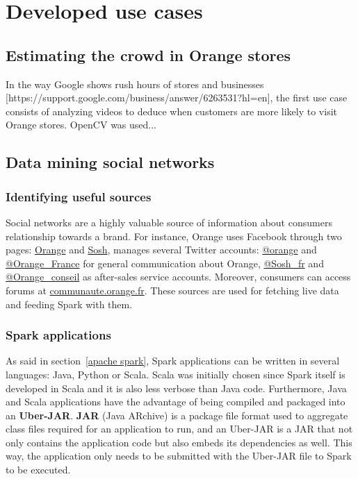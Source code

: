 \documentclass[11pt]{article}
\begin{document}
\section{Developed use cases}
\subsection{Estimating the crowd in Orange stores}

In the way \textsf{Google} shows rush hours of stores and businesses [https://support.google.com/business/answer/6263531?hl=en], the first use case consists of analyzing videos to deduce when customers are more likely to visit \textsf{Orange} stores. \textsf{OpenCV} was used...

\subsection{Data mining social networks}

\subsubsection{Identifying useful sources}

Social networks are a highly valuable source of information about consumers relationship towards a brand. For instance, \textsf{Orange} uses \textsf{Facebook} through two pages: \href{https://www.facebook.com/Orange.France/?ref=ts}{\textsf{Orange}} and \href{https://www.facebook.com/sosh/?fref=ts}{\textsf{Sosh}}, manages several \textsf{Twitter} accounts: \href{https://twitter.com/orange}{\textsf{@orange}} and \href{https://twitter.com/Orange_France}{\textsf{@Orange\_France}} for general communication about \textsf{Orange}, \href{https://twitter.com/Sosh_fr}{\textsf{@Sosh\_fr}} and \href{https://twitter.com/Orange_conseil}{\textsf{@Orange\_conseil}} as after-sales service accounts. Moreover, consumers can access forums at \href{https://communaute.orange.fr}{\url{communaute.orange.fr}}. These sources are used for fetching live data and feeding \textsf{Spark} with them.

\subsubsection{Spark applications}

As said in section~\ref{apache spark}, \textsf{Spark} applications can be written in several languages: \textsf{Java}, \textsf{Python} or \textsf{Scala}. \textsf{Scala} was initially chosen since \textsf{Spark} itself is developed in \textsf{Scala} and it is also less verbose than \textsf{Java} code. Furthermore, \textsf{Java} and \textsf{Scala} applications have the advantage of being compiled and packaged into an \textsf{\textbf{Uber-JAR}}. \textsf{\textbf{JAR}} (\textsf{Java} ARchive) is a package file format used to aggregate class files required for an application to run, and an \textsf{Uber-JAR} is a \textsf{JAR} that not only contains the application code but also embeds its dependencies as well. This way, the application only needs to be submitted with the \textsf{Uber-JAR} file to \textsf{Spark} to be executed.
\end{document}
